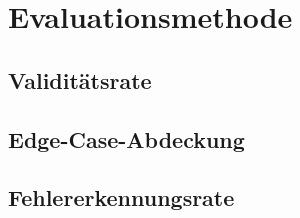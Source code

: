 \section{Evaluationsmethode}

\subsection{Validitätsrate}


\subsection{Edge-Case-Abdeckung}


\subsection{Fehlererkennungsrate}

\newpage